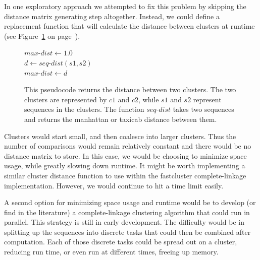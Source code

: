 In one exploratory approach we attempted to fix this problem by skipping the distance matrix generating step altogether.
Instead, we could define a replacement function that will calculate the distance between clusters at runtime (see Figure~\ref{code:LazyClustering} on page~\pageref{code:LazyClustering}).
\begin{figure}[h!]
\begin{algorithm}[H]
 \SetAlgoLined

\BlankLine
 $max$-$dist \gets 1.0$\\
  {
    {
    $d \gets seq$-$dist(s1, s2)$\\
     {
      $max$-$dist \gets d$
    }
   }
 }
\end{algorithm}
\caption[Pseudocode showing a distance function for two clusters.]{This pseudocode returns the distance between two clusters. The two clusters are represented by $c1$ and $c2$, while $s1$ and $s2$ represent sequences in the clusters. The function $seq$-$dist$ takes two sequences and returns the manhattan or taxicab distance between them.}
\label{code:LazyClustering}
\end{figure}
Clusters would start small, and then coalesce into larger clusters.
Thus the number of comparisons would remain relatively constant and there would be no distance matrix to store.
In this case, we would be choosing to minimize space usage, while greatly slowing down runtime.
It might be worth implementing a similar cluster distance function to use within the fastcluster complete-linkage implementation.
However, we would continue to hit a time limit easily.

A second option for minimizing space usage and runtime would be to develop (or find in the literature) a complete-linkage clustering algorithm that could run in parallel.
This strategy is still in early development.
The difficulty would be in splitting up the sequences into discrete tasks that could then be combined after computation.
Each of those discrete tasks could be spread out on a cluster, reducing run time, or even run at different times, freeing up memory.

